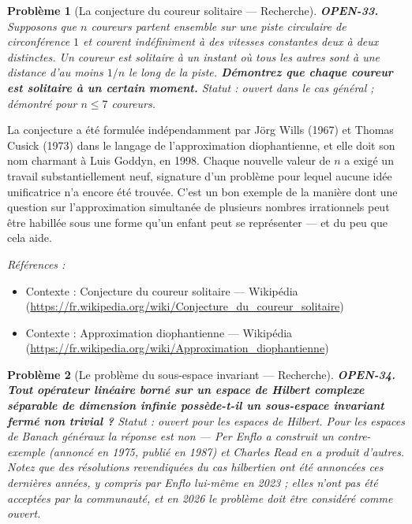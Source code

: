 \documentclass[11pt]{article}
\newtheorem{problem}{Problème}
\newenvironment{refs}{\par\small\noindent\emph{Références :}\begin{itemize}\setlength\itemsep{0pt}}{\end{itemize}\normalsize}
\begin{document}
\bigskip

\begin{problem}[{La conjecture du coureur solitaire --- Recherche}]
\textbf{OPEN-33.} Supposons que $ n $ coureurs partent ensemble sur
une piste circulaire de circonférence $ 1 $ et courent indéfiniment à des vitesses
constantes deux à deux distinctes. Un coureur est \textit{solitaire} à un instant où tous
les autres sont à une distance d'au moins $ 1/n $ le long de la piste. \textbf{Démontrez que
chaque coureur est solitaire à un certain moment.} Statut : ouvert dans le cas général ;
démontré pour $ n \leq 7 $ coureurs.
\end{problem}

\noindent La conjecture a été formulée indépendamment par Jörg Wills (1967) et
Thomas Cusick (1973) dans le langage de l'approximation diophantienne, et elle doit son nom
charmant à Luis Goddyn, en 1998. Chaque nouvelle valeur de $ n $ a exigé un travail
substantiellement neuf, signature d'un problème pour lequel aucune idée unificatrice n'a
encore été trouvée. C'est un bon exemple de la manière dont une question sur l'approximation
simultanée de plusieurs nombres irrationnels peut être habillée sous une forme qu'un enfant
peut se représenter --- et du peu que cela aide.

\begin{refs}
\item Contexte : Conjecture du coureur solitaire --- Wikipédia (\url{https://fr.wikipedia.org/wiki/Conjecture_du_coureur_solitaire})
\item Contexte : Approximation diophantienne --- Wikipédia (\url{https://fr.wikipedia.org/wiki/Approximation_diophantienne})
\end{refs}

\bigskip

\begin{problem}[{Le problème du sous-espace invariant --- Recherche}]
\textbf{OPEN-34.} \textbf{Tout opérateur linéaire borné sur un espace de
Hilbert complexe séparable de dimension infinie possède-t-il un sous-espace invariant
fermé non trivial ?} Statut : ouvert pour les espaces de Hilbert. Pour les espaces de
Banach généraux la réponse est \textit{non} --- Per Enflo a construit un contre-exemple
(annoncé en 1975, publié en 1987) et Charles Read en a produit d'autres. Notez que des
résolutions revendiquées du cas hilbertien ont été annoncées ces dernières années, y
compris par Enflo lui-même en 2023 ; elles n'ont pas été acceptées par la communauté, et
en 2026 le problème doit être considéré comme ouvert.
\end{problem}
\end{document}
